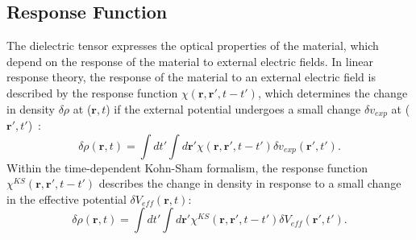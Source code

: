 \begin{refsection}
\subsection{Response Function} 

The dielectric tensor expresses the optical properties of the material, which 
depend on the response of the material to external electric fields. In linear 
response theory, the response of the material to an external electric field is 
described by the response function $\chi(\mathbf{r},\mathbf{r}', t - t')$, 
which determines the change in density $\delta \rho$ at ($\mathbf{r},t$) if the 
external potential undergoes a small change $\delta v_{exp}$ at 
($\mathbf{r}',t'$)~\cite{Harl2008}: 
\begin{equation}\label{dft:eq-response} 
\delta \rho (\mathbf{r},t) = \int dt' \int d\mathbf{r}' 
\chi(\mathbf{r},\mathbf{r}', t - t') \delta v_{exp} (\mathbf{r}',t'). 
\end{equation} 
Within the time-dependent Kohn-Sham formalism, the response function 
$\chi^{KS}(\mathbf{r},\mathbf{r}', t - t')$ describes the change in density in 
response to a small change in the effective potential $\delta 
V_{eff}(\mathbf{r},t)$: 
\begin{equation}\label{dft:eq-KSresponse} 
\delta \rho (\mathbf{r},t) = \int dt' \int d\mathbf{r}' 
\chi^{KS}(\mathbf{r},\mathbf{r}', t - t') \delta V_{eff} (\mathbf{r}',t'). 
\end{equation} 
 

\end{refsection}
